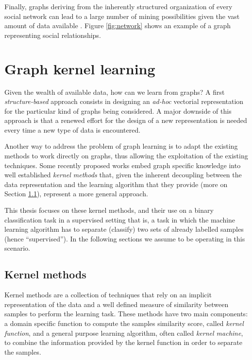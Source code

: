 Finally, graphs deriving from the inherently structured organization of every social
network can lead to a large number of mining possibilities given the vast
amount of data available \cite{gundecha2012mining}.
Figure \ref{fig:network} shows an example of a graph representing social relationships.

\section{Graph kernel learning}

Given the wealth of available data, how can we learn from graphs? A first \emph{structure-based}
approach consists in designing an \emph{ad-hoc} vectorial representation for the
particular kind of graphs being considered.
A major downside of this approach is that a renewed effort for the 
design of a new representation is needed every time a new type of data
is encountered.

Another way to address the problem of graph learning is to adapt the existing methods
to work directly on graphs, thus allowing the exploitation of the existing techniques.
Some recently proposed works \cite{DBLP:conf/sdm/MartinoNS12, NIPS2009_3813}
embed graph specific knowledge into well established \emph{kernel methods}
that, given the inherent decoupling between the data representation and the learning
algorithm that they provide (more on Section \ref{subsec:introkm}), represent a
more general approach.

This thesis focuses on these kernel methods, and their use on a binary classification
task in a supervised setting that is, a task in which the machine learning algorithm
has to separate (classify) two sets of already labelled samples (hence ``supervised'').
In the following sections we assume to be operating in this scenario.

\subsection{Kernel methods}
\label{subsec:introkm}

Kernel methods are a collection of techniques that rely on an implicit representation
of the data and a well defined measure of similarity between samples to perform
the learning task.
These methods have two main components: a domain specific function to compute the
samples similarity score, called \emph{kernel function}, and a general purpose
learning algorithm, often called \emph{kernel machine}, to combine the information provided by the
kernel function in order to separate the samples.


